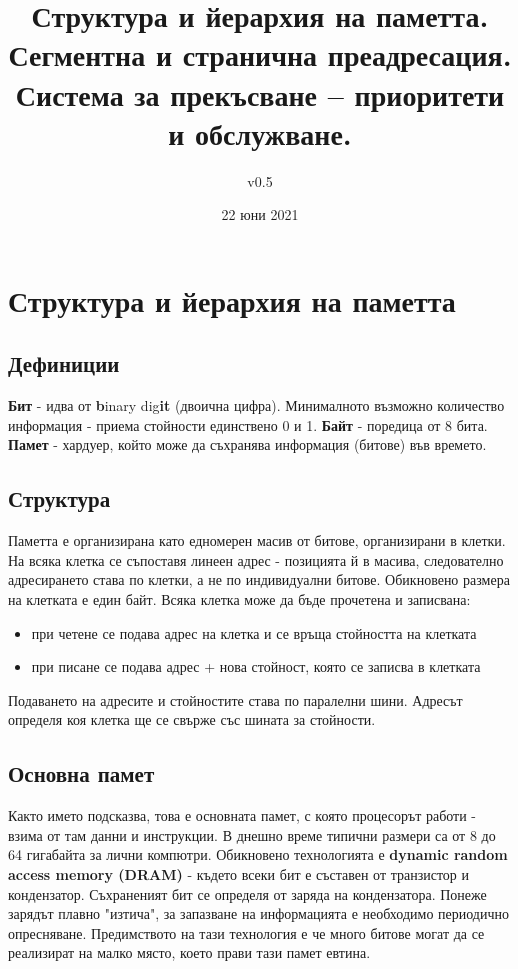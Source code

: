 \documentclass[fleqn,12pt]{article}
\title{Структура и йерархия на паметта. Сегментна и странична преадресация.
Система за прекъсване – приоритети и обслужване.}
\author{v0.5}
\date{22 юни 2021}
\begin{document}
\maketitle

\tableofcontents

\section{Структура и йерархия на паметта}

\subsection{Дефиниции}
\textbf{Бит} - идва от \textbf{b}inary dig\textbf{it} (двоична цифра). Минималното възможно количество информация - приема стойности единствено 0 и 1.
\textbf{Байт} - поредица от 8 бита.
\textbf{Памет} - хардуер, който може да съхранява информация (битове) във времето.

\subsection{Структура}
Паметта е организирана като едномерен масив от битове, организирани в клетки. На всяка клетка се съпоставя линеен адрес - позицията й в масива, 
следователно адресирането става по клетки, а не по индивидуални битове. Обикновено размера на клетката е един байт.
Всяка клетка може да бъде прочетена и записвана:
\begin{itemize}
    \item при четене се подава адрес на клетка и се връща стойността на клетката
    \item при писане се подава адрес + нова стойност, която се записва в клетката
\end{itemize}

Подаването на адресите и стойностите става по паралелни шини. Адресът определя коя клетка ще се свърже със шината за стойности.

\subsection{Основна памет}
Както името подсказва, това е основната памет, с която процесорът работи - взима от там данни и инструкции. 
В днешно време типични размери са от 8 до 64 гигабайта за лични компютри.
Обикновено технологията е \textbf{dynamic random access memory (DRAM)} - където всеки бит е съставен от транзистор и кондензатор.
Съхраненият бит се определя от заряда на кондензатора. Понеже зарядът плавно "изтича", за запазване на информацията е необходимо
периодично опресняване. Предимството на тази технология е че много битове могат да се реализират на малко място, което прави тази памет евтина.
\end{document}
